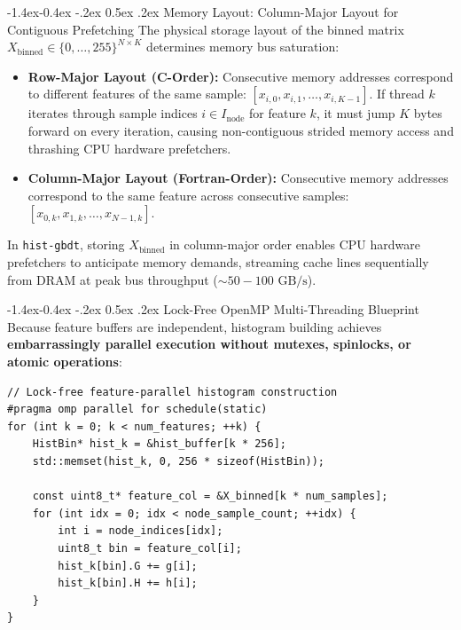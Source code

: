 \documentclass[11pt,a4paper]{article}
\makeatletter
\renewcommand\subsection{\@startsection{subsection}{2}{\z@}%
                                     {-1.4ex\@plus -0.4ex \@minus -.2ex}%
                                     {0.5ex \@plus .2ex}%
                                     {\normalfont\normalsize\bfseries}}
\makeatother
\begin{document}
\subsection{Memory Layout: Column-Major Layout for Contiguous Prefetching}
The physical storage layout of the binned matrix $X_{\text{binned}} \in \{0, \dots, 255\}^{N \times K}$ determines memory bus saturation:
\begin{itemize}
    \item \textbf{Row-Major Layout (C-Order):} Consecutive memory addresses correspond to different features of the same sample: $[x_{i, 0}, x_{i, 1}, \dots, x_{i, K-1}]$. If thread $k$ iterates through sample indices $i \in I_{\text{node}}$ for feature $k$, it must jump $K$ bytes forward on every iteration, causing non-contiguous strided memory access and thrashing CPU hardware prefetchers.
    \item \textbf{Column-Major Layout (Fortran-Order):} Consecutive memory addresses correspond to the same feature across consecutive samples: $[x_{0, k}, x_{1, k}, \dots, x_{N-1, k}]$.
\end{itemize}
In \texttt{hist-gbdt}, storing $X_{\text{binned}}$ in column-major order enables CPU hardware prefetchers to anticipate memory demands, streaming cache lines sequentially from DRAM at peak bus throughput ($\sim 50 - 100 \text{ GB/s}$).

\subsection{Lock-Free OpenMP Multi-Threading Blueprint}
Because feature buffers are independent, histogram building achieves \textbf{embarrassingly parallel execution without mutexes, spinlocks, or atomic operations}:

\begin{verbatim}
// Lock-free feature-parallel histogram construction
#pragma omp parallel for schedule(static)
for (int k = 0; k < num_features; ++k) {
    HistBin* hist_k = &hist_buffer[k * 256];
    std::memset(hist_k, 0, 256 * sizeof(HistBin));
    
    const uint8_t* feature_col = &X_binned[k * num_samples];
    for (int idx = 0; idx < node_sample_count; ++idx) {
        int i = node_indices[idx];
        uint8_t bin = feature_col[i];
        hist_k[bin].G += g[i];
        hist_k[bin].H += h[i];
    }
}
\end{verbatim}
\end{document}
